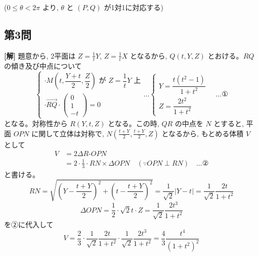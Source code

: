 \documentclass[../main.tex]{subfiles}
\begin{document}
\noindent
($0 \le \theta < 2\pi$ より, $\theta$ と $(P, Q)$ が1対1に対応する)

\newpage

\subsection*{第3問}

\noindent
\textbf{[解]} 題意から, 2平面は $Z = \frac{1}{t} Y$, $Z = \frac{1}{t} X$ となるから, $Q(t, Y, Z)$ とおける。$RQ$ の傾き及び中点について
\[
  \begin{cases}
    \cdot M\left(t, \dfrac{Y+t}{2}, \dfrac{Z}{2}\right) \text{ が } Z = \dfrac{1}{t} Y \text{ 上} \\[1ex]
    \cdot \vec{RQ} \cdot
    \begin{pmatrix} 0 \\ 1 \\ -t
    \end{pmatrix} = 0
  \end{cases}
  \dots
  \begin{cases} Y = \dfrac{t(t^2-1)}{1+t^2} \\[1.5ex] Z = \dfrac{2t^2}{1+t^2}
  \end{cases} \quad \dots \text{①}
\]
となる。対称性から $R(Y, t, Z)$ となる。この時, $QR$ の中点を $N$ とすると, 平面 $OPN$ に関して立体は対称で, $N\left(\frac{t+Y}{2}, \frac{t+Y}{2}, Z\right)$ となるから, もとめる体積 $V$ として
\begin{align*}
  V &= 2 \Delta R\text{-}OPN \\
  &= 2 \cdot \frac{1}{3} \cdot RN \times \Delta OPN \quad (\because OPN \perp RN) \quad \dots \text{②}
\end{align*}
と書ける。
\[
  RN = \sqrt{\left(Y - \frac{t+Y}{2}\right)^2 + \left(t - \frac{t+Y}{2}\right)^2} = \frac{1}{\sqrt{2}} |Y - t| = \frac{1}{\sqrt{2}} \frac{2t}{1+t^2}
\]
\[
  \Delta OPN = \frac{1}{2} \cdot \sqrt{2}t \cdot Z = \frac{1}{\sqrt{2}} \frac{2t^3}{1+t^2}
\]
を②に代入して
\[
  V = \frac{2}{3} \cdot \frac{1}{\sqrt{2}} \frac{2t}{1+t^2} \cdot \frac{1}{\sqrt{2}} \frac{2t^3}{1+t^2} = \frac{4}{3} \frac{t^4}{(1+t^2)^2}
\]

\begin{center}
\end{center}
\end{document}
